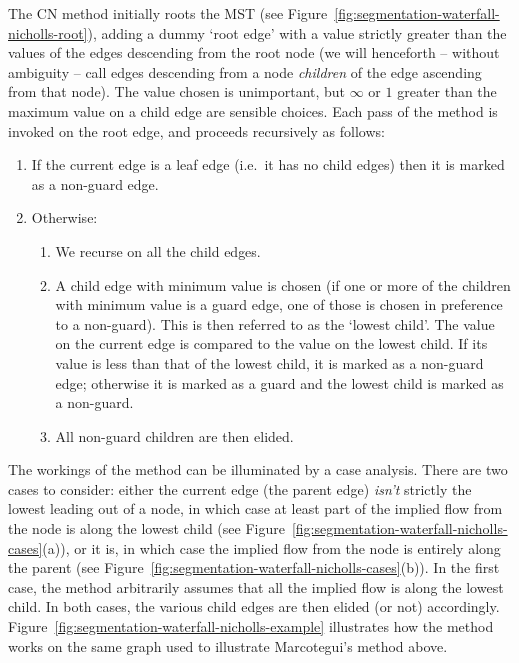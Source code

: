 \documentclass[preprint,a4paper]{elsarticle}
\begin{document}
The CN method initially roots the MST (see Figure~\ref{fig:segmentation-waterfall-nicholls-root}), adding a dummy `root edge' with a value strictly greater than the values of the edges descending from the root node (we will henceforth -- without ambiguity -- call edges descending from a node \emph{children} of the edge ascending from that node). The value chosen is unimportant, but $\infty$ or $1$ greater than the maximum value on a child edge are sensible choices. Each pass of the method is invoked on the root edge, and proceeds recursively as follows:
%
\begin{enumerate}

\item If the current edge is a leaf edge (i.e.~it has no child edges) then it is marked as a non-guard edge.

\item Otherwise:

\begin{enumerate}

\item We recurse on all the child edges.

\item A child edge with minimum value is chosen (if one or more of the children with minimum value is a guard edge, one of those is chosen in preference to a non-guard). This is then referred to as the `lowest child'. The value on the current edge is compared to the value on the lowest child. If its value is less than that of the lowest child, it is marked as a non-guard edge; otherwise it is marked as a guard and the lowest child is marked as a non-guard.

\item All non-guard children are then elided.

\end{enumerate}

\end{enumerate}

\noindent The workings of the method can be illuminated by a case analysis. There are two cases to consider: either the current edge (the parent edge) \emph{isn't} strictly the lowest leading out of a node, in which case at least part of the implied flow from the node is along the lowest child (see Figure~\ref{fig:segmentation-waterfall-nicholls-cases}(a)), or it is, in which case the implied flow from the node is entirely along the parent (see Figure~\ref{fig:segmentation-waterfall-nicholls-cases}(b)). In the first case, the method arbitrarily assumes that all the implied flow is along the lowest child. In both cases, the various child edges are then elided (or not) accordingly. Figure~\ref{fig:segmentation-waterfall-nicholls-example} illustrates how the method works on the same graph used to illustrate Marcotegui's method above.
\end{document}

